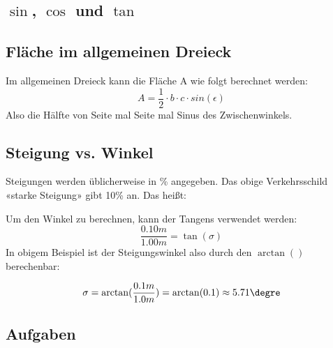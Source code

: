 \subsection{$\sin{}$, $\cos{}$ und $\tan{}$}


\newpage
\subsection{Fläche im allgemeinen Dreieck}


Im allgemeinen Dreieck kann die Fläche A wie folgt berechnet werden:
$$A = \frac{1}{2}\cdot{}b\cdot{}c\cdot{}sin(\epsilon)$$
Also die Hälfte von Seite mal Seite mal Sinus des Zwischenwinkels.
\newpage


\subsection{Steigung vs. Winkel}


Steigungen werden üblicherweise in \% angegeben. Das obige
Verkehrsschild «starke Steigung» gibt 10\% an. Das heißt:


Um den Winkel zu berechnen, kann der Tangens verwendet werden:
$$\frac{0.10m}{1.00m} = \tan(\sigma)$$
In obigem Beispiel ist der Steigungswinkel also durch den $\arctan()$
berechenbar:

$$\sigma = \arctan(\frac{0.1m}{1.0m}) = \arctan(0.1) \approx 5.71\degre$$

\subsection*{Aufgaben}
%
\newpage
